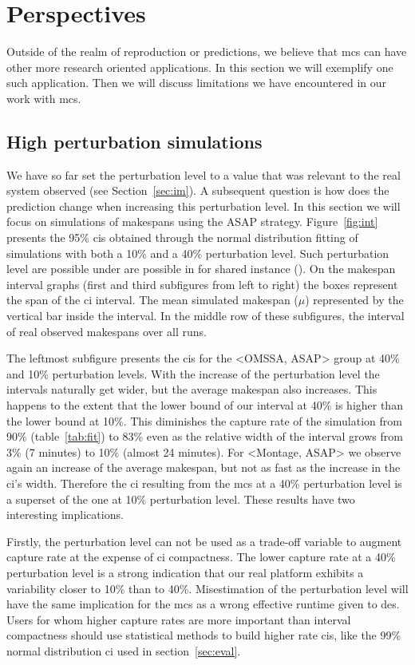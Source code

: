 \documentclass[10pt,conference,compsocconf]{IEEEtran}
\begin{document}
\section{Perspectives}
\label{sec:disc}
Outside of the realm of reproduction or predictions, we believe that \ac{mcs}
can have other more research oriented applications. In this section we will
exemplify one such application. Then we will discuss limitations we have
encountered in our work with \ac{mcs}.

\subsection{High perturbation simulations}\label{sec:sa}

We have so  far set the perturbation level  to a value that was  relevant to the
real system observed  (see Section~\ref{sec:im}).  A subsequent  question is how
does the prediction change when increasing this perturbation level. In this
section we will focus on simulations of makespans using the ASAP strategy.
Figure~\ref{fig:int} presents the 95\% \acp{ci} obtained through the normal
distribution fitting of simulations with both a 10\%
and a 40\% perturbation  level. Such perturbation level are possible under are
possible in for shared instance (\cite{LeitnerC16}). On the makespan interval graphs  (first and third
subfigures  from left  to right)  the boxes  represent the  span of the \ac{ci}
interval. The mean simulated makespan ($\mu{}$) represented by the vertical bar
inside the interval. In the middle row of these subfigures, the interval of 
real observed  makespans over all runs.

The leftmost subfigure presents the \acp{ci} for the <OMSSA, ASAP> group at
40\% and 10\% perturbation levels. With the increase of the perturbation level
the intervals naturally get wider, but the average makespan also increases. 
This happens to the 
extent that the lower bound of our interval at 40\% is higher than the lower
bound at 10\%. This diminishes the capture rate of the simulation from 90\%
(table~\ref{tab:fit}) to 83\% even as the relative width of the interval grows
from 3\% (7 minutes) to 10\% (almost 24 minutes). For <Montage, ASAP> we observe
again an increase of the average makespan, but not as fast as the increase in
the \ac{ci}'s width. Therefore the \ac{ci} resulting from the \ac{mcs} at a
40\% perturbation level is a superset of the one at 10\% perturbation level.
These results have two interesting implications.

Firstly, the perturbation level can
not be used as a trade-off variable to augment capture rate at the expense of
\ac{ci} compactness. The lower capture rate at a 40\% perturbation level is a
strong indication that our real platform exhibits a variability closer to
10\% than to 40\%. Misestimation of the perturbation level will have the same
implication for the \ac{mcs} as a wrong effective runtime given to \ac{des}. 
Users for whom higher capture rates are more important than
interval compactness should use statistical methods to build higher rate \acp{ci},
like the 99\% normal distribution \ac{ci} used in section~\ref{sec:eval}.
\end{document}
